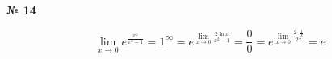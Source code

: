 \documentclass{article}
\begin{document}
\textbf{№ 14} 
\Large

$$ \lim\limits_{x\to 0} e^{\frac{x^2}{x^2-1}}
= 1^{\infty}
= e^{\lim\limits_{x\to 0} \frac{2\ln{x}}{x^2-1}}
= \frac{0}{0}
= e^{\lim\limits_{x\to 0} \frac{2\cdot \frac{1}{x}}{2x}}
= e $$
\end{document}
